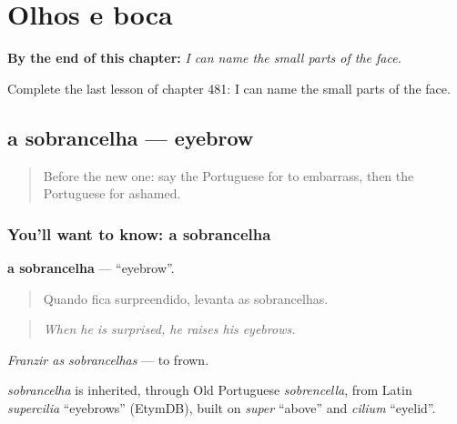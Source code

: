 
\chapter{Olhos e boca}
\label{ch:pt-olhos-e-boca}

\begin{chapteropening}
\textbf{By the end of this chapter:} \emph{I can name the small parts of the face.}

Complete the last lesson of chapter 481: I can name the small parts of the face.
\end{chapteropening}

\section[a sobrancelha]{a sobrancelha — eyebrow}

\label{lesson:PT-C481-sobrancelha}



\begin{quote}
Before the new one: say the Portuguese for to embarrass, then the Portuguese for ashamed.
\end{quote}

\subsection*{You'll want to know: a sobrancelha}
\textbf{a sobrancelha} — \textquotedblleft{}eyebrow\textquotedblright{}.

\begin{quote}
Quando fica surpreendido, levanta as sobrancelhas.
\end{quote}

\begin{quote}
\emph{When he is surprised, he raises his eyebrows.}
\end{quote}

\emph{Franzir as sobrancelhas} — to frown.

\begin{cousinweb}
\emph{sobrancelha} is inherited, through Old Portuguese \emph{sobrencella}, from Latin \emph{supercilia} \textquotedblleft{}eyebrows\textquotedblright{} (EtymDB), built on \emph{super} \textquotedblleft{}above\textquotedblright{} and \emph{cilium} \textquotedblleft{}eyelid\textquotedblright{}.
\end{cousinweb}

